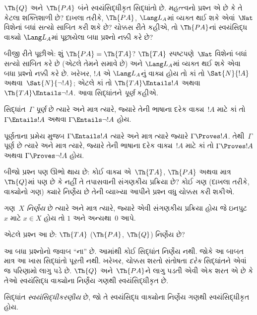 $\Th{Q}$ અને~$\Th{PA}$ બંને
સ્વયંસિદ્ધીકૃત સિદ્ધાંતો છે. મહત્ત્વનો પ્રશ્ન
એ છે કે તે કેટલા શક્તિશાળી છે? દાખલા તરીકે,
$\Th{PA}$, $\Lang L_A$માં વ્યક્ત થઈ શકે
એવાં~$\Nat$ વિશેનાં બધાં સત્યો સાબિત કરી
શકે છે? ચોક્કસ રીતે કહીએ, તો
$\Th{PA}$નાં સ્વયંસિદ્ધ વાક્યો
$\Lang L_A$માં પૂછાયેલા બધા પ્રશ્નો
નક્કી કરે છે?

બીજી રીતે પૂછીએ: શું $\Th{PA} = \Th{TA}$?
$\Th{TA}$ સ્પષ્ટપણે~$\Nat$ વિશેનાં બધાં
સત્યો સાબિત કરે છે (એટલે તેમને સમાવે છે) અને
$\Lang L_A$માં વ્યક્ત થઈ શકે એવા બધા
પ્રશ્નો નક્કી કરે છે. ખરેખર, $!A$ એ
$\Lang L_A$નું વાક્ય હોય તો કાં તો
$\Sat{N}{!A}$ અથવા~$\Sat{N}{\lnot !A}$;
એટલે કાં તો $\Th{TA} \Entails !A$ અથવા
$\Th{TA} \Entails \lnot !A$. આવા સિદ્ધાંતને
\emph{પૂર્ણ} કહીએ.

\begin{defn}
સિદ્ધાંત~$\Gamma$ \emph{પૂર્ણ} છે
ત્યારે અને માત્ર ત્યારે, જ્યારે તેની ભાષાના
દરેક વાક્ય~$!A$ માટે કાં તો
$\Gamma \Entails !A$ અથવા
$\Gamma \Entails \lnot !A$ હોય.
\end{defn}

\begin{explain}
પૂર્ણતાના પ્રમેય મુજબ
$\Gamma \Entails !A$ ત્યારે અને માત્ર ત્યારે
જ્યારે $\Gamma \Proves !A$. તેથી~$\Gamma$
પૂર્ણ છે ત્યારે અને માત્ર ત્યારે, જ્યારે
તેની ભાષાના દરેક વાક્ય~$!A$ માટે
કાં તો $\Gamma \Proves !A$ અથવા
$\Gamma \Proves \lnot !A$ હોય.
\end{explain}

બીજો પ્રશ્ન પણ ઊભો થાય છે: કોઈ
વાક્ય એ~$\Th{TA}$, $\Th{PA}$
અથવા માત્ર~$\Th{Q}$માં પણ છે કે નહીં તે
તપાસવાની સંગણકીય પ્રક્રિયા છે? કોઈ ગણ
(દાખલા તરીકે, વાક્યોનો ગણ)
ક્યારે નિર્ણેય છે તેની વ્યાખ્યા
આપીને પ્રશ્ન વધુ ચોક્કસ કરી શકીએ.

\begin{defn}
ગણ~$X$ \emph{નિર્ણેય} છે ત્યારે
અને માત્ર ત્યારે, જ્યારે એવી સંગણકીય પ્રક્રિયા
હોય જે ઇનપુટ~$x$ માટે $x \in X$ હોય તો
$1$ અને અન્યથા~$0$ આપે.
\end{defn}

એટલે પ્રશ્ન આ છે: $\Th{TA}$
($\Th{PA}$, $\Th{Q}$) નિર્ણેય છે?

આ બધા પ્રશ્નોનો જવાબ ``ના'' છે. આમાંથી
કોઈ સિદ્ધાંત નિર્ણેય નથી. જોકે આ બાબત માત્ર
આ ખાસ સિદ્ધાંતો પૂરતી નથી. ખરેખર,
ચોક્કસ શરતો સંતોષતા \emph{દરેક} સિદ્ધાંતને
એવાં જ પરિણામો લાગુ પડે છે. $\Th{Q}$
અને~$\Th{PA}$ને લાગુ પડતી એવી એક શરત
એ છે કે તેઓ સ્વયંસિદ્ધ વાક્યોના
નિર્ણેય ગણથી સ્વયંસિદ્ધીકૃત છે.

\begin{defn}
સિદ્ધાંત \emph{સ્વયંસિદ્ધીકરણીય} છે, જો
તે સ્વયંસિદ્ધ વાક્યોના નિર્ણેય ગણથી
સ્વયંસિદ્ધીકૃત હોય.
\end{defn}


